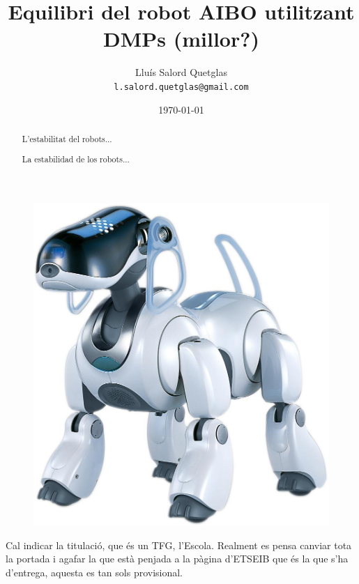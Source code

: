 \documentclass[12pt,a4paper,final,twoside]{article}
\title{Equilibri del robot AIBO utilitzant DMPs (millor?)}
\author{Lluís Salord Quetglas\\
		\texttt{l.salord.quetglas@gmail.com}\\}
\date{\today}
\begin{document}
\maketitle
\thispagestyle{empty}
\begin{figure}[h!]
\centering
\includegraphics[scale=0.1]{Imatges/ERS7.jpg} 
\end{figure}

Cal indicar la titulació, que és un TFG, l'Escola.
Realment es pensa canviar tota la portada i agafar la que està penjada a la pàgina d'ETSEIB que és la que s'ha d'entrega, aquesta es tan sols provisional.

\newpage
\paragraph{}
\thispagestyle{empty}
\cleardoublepage

\setcounter{page}{1} %

\begin{abstract}
L'estabilitat del robots...
\end{abstract}

\renewcommand{\abstractname}{Resumen}
\begin{abstract}
La estabilidad de los robots...
\end{abstract}
\end{document}
